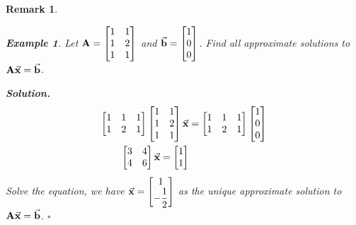 \documentclass[12pt, a4paper]{article}
\newtheorem{eg}{Example}[subsection]
\newtheorem*{rmk}{\indent Remark}
\newenvironment*{sol}{\par\indent\textbf{\textit{Solution. }}}{\hfill{$\square$}\par}
\def\vecx{\va{x}}
\def\vecb{\va{b}}
\def\matrixA{\vb{A}}
\begin{document}
\begin{rmk}
	\begin{eg}
		Let $\matrixA=\begin{bmatrix}1&1\\1&2\\1&1\end{bmatrix}$ and $\vecb=\begin{bmatrix}1\\0\\0\end{bmatrix}$. Find all approximate solutions to $\matrixA\vecx=\vecb$.\\ 
		\begin{sol}
			$$\begin{aligned}
				\begin{bmatrix}1&1&1\\1&2&1\end{bmatrix}\begin{bmatrix}1&1\\1&2\\1&1\end{bmatrix}\vecx&=\begin{bmatrix}1&1&1\\1&2&1\end{bmatrix}\begin{bmatrix}1\\0\\0\end{bmatrix}\\
				\begin{bmatrix}3&4\\4&6\end{bmatrix}\vecx=\begin{bmatrix}1\\1\end{bmatrix}
			\end{aligned}$$
			Solve the equation, we have $\vecx=\begin{bmatrix}1\\-\dfrac{1}{2}\end{bmatrix}$ as the unique approximate solution to $\matrixA\vecx=\vecb$.
		\end{sol}
	\end{eg}
\end{rmk}
\end{document}
